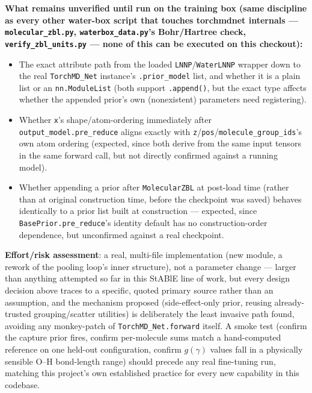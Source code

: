 \documentclass[11pt]{article}
\begin{document}
\textbf{What remains unverified until run on the training box (same
discipline as every other water-box script that touches torchmdnet
internals --- \texttt{molecular\_zbl.py}, \texttt{waterbox\_data.py}'s
Bohr/Hartree check, \texttt{verify\_zbl\_units.py} --- none of this can be
executed on this checkout):}
\begin{itemize}
  \item The exact attribute path from the loaded \texttt{LNNP}/\texttt{WaterLNNP}
  wrapper down to the real \texttt{TorchMD\_Net} instance's
  \texttt{.prior\_model} list, and whether it is a plain list or an
  \texttt{nn.ModuleList} (both support \texttt{.append()}, but the exact
  type affects whether the appended prior's own (nonexistent) parameters
  need registering).
  \item Whether \texttt{x}'s shape/atom-ordering immediately after
  \texttt{output\_model.pre\_reduce} aligns exactly with
  \texttt{z}/\texttt{pos}/\texttt{molecule\_group\_ids}'s own atom
  ordering (expected, since both derive from the same input tensors in the
  same forward call, but not directly confirmed against a running model).
  \item Whether appending a prior after \texttt{MolecularZBL} at
  post-load time (rather than at original construction time, before the
  checkpoint was saved) behaves identically to a prior list built at
  construction --- expected, since \texttt{BasePrior.pre\_reduce}'s
  identity default has no construction-order dependence, but unconfirmed
  against a real checkpoint.
\end{itemize}

\textbf{Effort/risk assessment}: a real, multi-file implementation (new
module, a rework of the pooling loop's inner structure), not a parameter
change --- larger than anything attempted so far in this StABlE line of
work, but every design decision above traces to a specific, quoted primary
source rather than an assumption, and the mechanism proposed
(side-effect-only prior, reusing already-trusted grouping/scatter
utilities) is deliberately the least invasive path found, avoiding any
monkey-patch of \texttt{TorchMD\_Net.forward} itself. A smoke test
(confirm the capture prior fires, confirm per-molecule sums match a
hand-computed reference on one held-out configuration, confirm
$g(\gamma)$ values fall in a physically sensible O--H bond-length range)
should precede any real fine-tuning run, matching this project's own
established practice for every new capability in this codebase.
\end{document}
